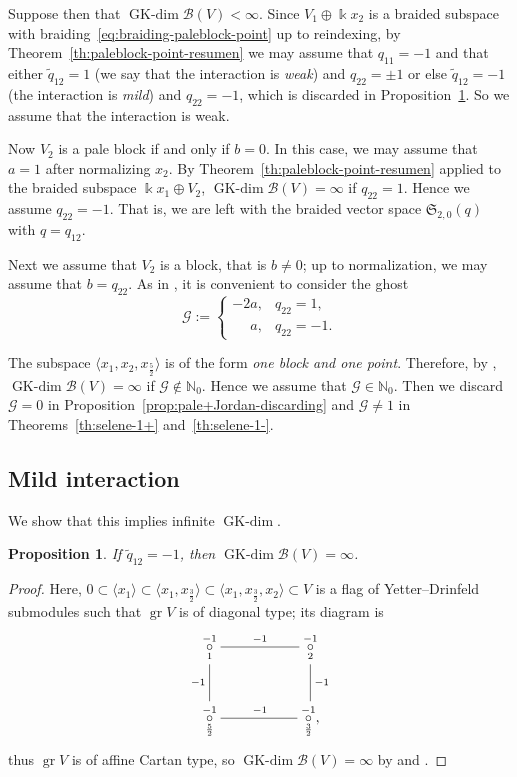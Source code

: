 \documentclass[pdftex]{sigma}
\numberwithin{equation}{section}
\newtheorem{Proposition}[Theorem]{Proposition}
 { \theoremstyle{definition}
\newtheorem{Definition}[Theorem]{Definition}
\newtheorem{Note}[Theorem]{Note}
\newtheorem{Example}[Theorem]{Example}
\newtheorem{Remark}[Theorem]{Remark} }
\newcommand{\GK}{\operatorname{GK-dim}}
\newcommand{\gr}{\operatorname{gr}}
\newcommand{\toba}{\mathscr B}
\newcommand{\ghost}{\mathscr{G}}
\newcommand{\sele}{\mathfrak{S}}
\newcommand{\N}{{\mathbb N}}
\newcommand{\tresdos}{\frac{3}{2}}
\newcommand{\cincodos}{\frac{5}{2}}
\begin{document}
Suppose then that $\GK \toba(V) < \infty$.
Since $V_1 \oplus \Bbbk x_2$ is a braided subspace with braiding~\eqref{eq:braiding-paleblock-point} up to reindexing,
by Theorem~\ref{th:paleblock-point-resumen}
we may assume that $q_{11} = -1$ and
that either $\widetilde{q}_{12}=1$ (we say that the interaction is \emph{weak}) and $q_{22}=\pm 1$
or else $\widetilde{q}_{12}=-1$ (the interaction is \emph{mild}) and $q_{22}=-1$,
which is discarded in Proposition~\ref{prop:mild-2blocks}.
So we assume that the interaction is weak.

Now $V_2$ is a pale block if and only if $b=0$. In this case, we may assume that $a =1$ after normalizing $x_2$.
By Theorem~\ref{th:paleblock-point-resumen} applied to the braided subspace $\Bbbk x_1\oplus V_2$, $\GK \toba(V) =\infty$ if $q_{22}=1$.
Hence we assume $q_{22}=-1$. That is, we are left with the braided vector space $\sele_{2,0}(q)$ with $q= q_{12}$.

Next we assume that $V_2$ is a block, that is $b\neq 0$; up to normalization, we may assume that $b= q_{22}$.
As in \cite{AAH-triang}, it is convenient to consider the ghost
\begin{equation}\label{eq:discrete-ghost}
\ghost := \begin{cases} -2a, & q_{22} = 1,
\\
\phantom{-2}a, & q_{22} = -1.
\end{cases}
\end{equation}

The subspace $\big\langle x_1, x_2, x_\cincodos \big\rangle$ is of the form
\emph{one block and one point}. Therefore,
by \cite[Lem\-ma~4.2.3]{AAH-triang},
$\GK \toba(V) =\infty$ if $\ghost \notin \N_0$.
Hence we assume that $\ghost\in \N_0$. Then we discard $\ghost = 0$ in
Proposition~\ref{prop:pale+Jordan-discarding} and $\ghost \neq 1$ in Theorems~\ref{th:selene-1+} and~\ref{th:selene-1-}.

\subsection{Mild interaction} 

We show that this implies infinite $\GK$.

\begin{Proposition}\label{prop:mild-2blocks}
If $\widetilde{q}_{12} = -1$, then $\GK \toba(V)=\infty$.
\end{Proposition}
\begin{proof}
Here, $0 \subset \langle x_1\rangle \subset \big\langle x_1, x_{\tresdos} \big\rangle \subset \big\langle x_1, x_{\tresdos}, x_2 \big\rangle \subset V$ is a flag of Yetter--Drinfeld submodules such that $\gr V$ is of diagonal type; its diagram is
$$
\xymatrix{
\overset{-1}{\underset{1} {\circ}}\ar @{-}[d]_{-1} \ar @{-}[rr]^{-1} & & \overset{-1} {\underset{2} {\circ}}\ar @{-}[d]^{-1} \\
\overset{-1}{\underset{\cincodos} {\circ}} \ar @{-}[rr]^{-1} && \overset{-1}{\underset{\tresdos} {\circ}},}
$$
thus $\gr V$ is of affine Cartan type, so $\GK \toba(V) = \infty$ by \cite{AAH-diag} and
\cite[Lemma~3.4.2\,(c)]{AAH-triang}.
\end{proof}
\end{document}

